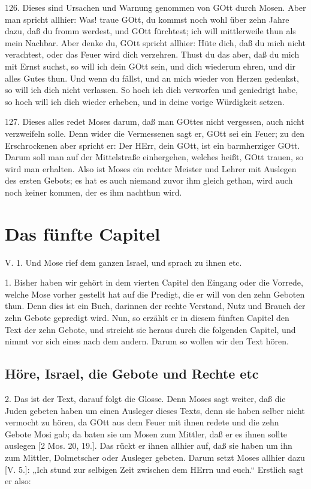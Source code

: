 126. Dieses sind Ursachen und Warnung genommen von GOtt durch Mosen. Aber man spricht allhier: Was! traue GOtt, du kommst noch wohl über zehn Jahre dazu, daß du fromm werdest, und GOtt fürchtest; ich will mittlerweile thun als mein Nachbar. Aber denke du, GOtt spricht allhier: Hüte dich, daß du mich nicht verachtest, oder das Feuer wird dich verzehren. Thust du das aber, daß du mich mit Ernst suchst, so will ich dein GOtt sein, und dich wiederum ehren, und dir alles Gutes thun. Und wenn du fällst, und an mich wieder von Herzen gedenkst, so will ich dich nicht verlassen. So hoch ich dich verworfen und geniedrigt habe, so hoch will ich dich wieder erheben, und in deine vorige Würdigkeit setzen.

127. Dieses alles redet Moses darum, daß man GOttes nicht vergessen, auch nicht verzweifeln solle. Denn wider die Vermessenen sagt er, GOtt sei ein Feuer; zu den Erschrockenen aber spricht er: Der HErr, dein GOtt, ist ein barmherziger GOtt. Darum soll man auf der Mittelstraße einhergehen, welches heißt, GOtt trauen, so wird man erhalten. Also ist Moses ein rechter Meister und Lehrer mit Auslegen des ersten Gebots; es hat es auch niemand zuvor ihm gleich gethan, wird auch noch keiner kommen, der es ihm nachthun wird.

\section{Das fünfte Capitel}

\begin{schriftzitat}
V. 1. Und Mose rief dem ganzen Israel, und sprach zu ihnen etc.
\end{schriftzitat}

1. Bisher haben wir gehört in dem vierten Capitel den Eingang oder die Vorrede, welche Mose vorher gestellt hat auf die Predigt, die er will von den zehn Geboten thun. Denn dies ist ein Buch, darinnen der rechte Verstand, Nutz und Brauch der zehn Gebote gepredigt wird. Nun, so erzählt er in diesem fünften Capitel den Text der zehn Gebote, und streicht sie heraus durch die folgenden Capitel, und nimmt vor sich eines nach dem andern. Darum so wollen wir den Text hören.

\subsection{Höre, Israel, die Gebote und Rechte etc}

2. Das ist der Text, darauf folgt die Glosse. Denn Moses sagt weiter, daß die Juden gebeten haben um einen Ausleger dieses Texts, denn sie haben selber nicht vermocht zu hören, da GOtt aus dem Feuer mit ihnen redete und die zehn Gebote Mosi gab; da baten sie um Mosen zum Mittler, daß er es ihnen sollte auslegen [2 Mos. 20, 19.]. Das rückt er ihnen allhier auf, daß sie haben um ihn zum Mittler, Dolmetscher oder Ausleger gebeten. Darum setzt Moses allhier dazu [V. 5.]: „Ich stund zur selbigen Zeit zwischen dem HErrn und euch.“ Erstlich sagt er also:

